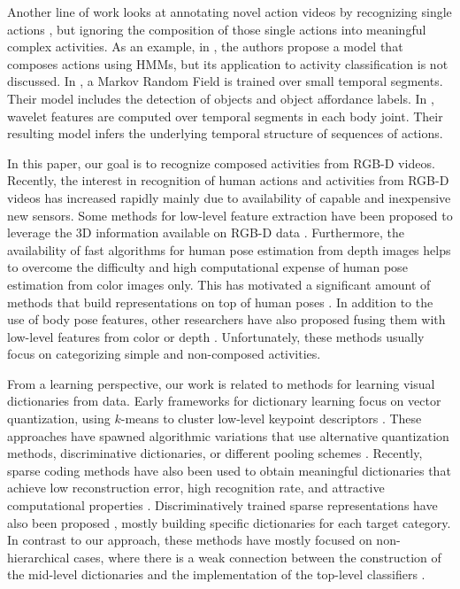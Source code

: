 Another line of work looks at annotating novel
action videos by recognizing single actions \cite{Ramanan2003}, but ignoring
the composition of those single actions into meaningful complex activities. As an example, in
\cite{Ikizler2008a}, the authors propose a model that composes actions using HMMs, but its application to activity
classification is not discussed.
In \cite{Koppula2012}, a
Markov Random Field is trained over small temporal segments.
Their model includes the detection of objects and object affordance labels.
In \cite{Wei2013}, wavelet features are computed over temporal segments
in each body joint. Their resulting model infers the underlying temporal structure of sequences of actions.


In this paper, our goal is to recognize composed activities from RGB-D
videos.
Recently, the interest in recognition of human actions and activities from RGB-D
videos has increased rapidly \cite{aggarwal2014human}
mainly due to availability of capable and inexpensive new sensors.
Some methods for low-level feature extraction have been proposed to leverage
the 3D information available on RGB-D data
\cite{Oreifej2013,wan20143d,luo2014spatio}.
Furthermore, the availability of
fast algorithms for human pose estimation
\cite{Shotton2011,Microsoft2012} from depth images
helps to overcome the difficulty and high computational expense of human
pose estimation from color images only.
This has motivated a significant amount of methods that build
representations on top of human
poses
\cite{Sung2012,Xia2012,Escorcia2012,vemulapalli2014human}.
In addition to the use of body pose features, other researchers
have also proposed fusing them with low-level features from
color \cite{chaaraoui2013fusion,Shahroudy2014,zhu2013fusing} or depth \cite{Wang2012}.
Unfortunately,
these methods usually focus on categorizing simple and non-composed
activities.


From a learning perspective, our work is related to methods for learning
visual dictionaries from data. Early frameworks for dictionary learning focus on
vector
quantization, using $k$-means to cluster low-level keypoint
descriptors
\cite{Csurka:EtAl:04}. These approaches have spawned
algorithmic variations that use alternative quantization methods,
discriminative dictionaries, or different pooling schemes
\cite{Jurie:Triggs:05,Lazebnik:Schmid:Ponce:2006}. Recently, sparse
coding methods have also been used to obtain meaningful dictionaries that achieve low
reconstruction error, high recognition rate, and attractive computational properties 
\cite{Castrodad:Sapiro:12}. Discriminatively trained sparse
representations have also been proposed \cite{Boureau:Etal:10,Mairal:EtAl:08}, mostly building specific dictionaries for each
target category. In contrast to our approach, these methods have mostly focused on
non-hierarchical cases, where there is a weak
connection between the construction of the mid-level dictionaries and the implementation of
the top-level classifiers \cite{Yang2009}.

